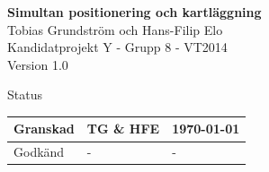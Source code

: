 \documentclass[a4paper,12pt,fleqn]{article}
\begin{document}
	\pagestyle{fancy}
	\vspace*{\fill}
		\begingroup
			\begin{center}
				\huge{\textbf{Simultan positionering och kartläggning}}
				\\
				\vspace{10pt}
				\normalsize
				Tobias Grundström och Hans-Filip Elo
				\\
				Kandidatprojekt Y - Grupp 8 - VT2014
				\\
				Version 1.0
				\end{center}
		\endgroup
	\vspace*{\fill}

	\begin{center} %
		Status
		\\
		\vspace{3pt} %
	    \begin{tabular}{| p{3cm} | p{3cm} | p{3cm} |} %
	    \hline %
	    Granskad & TG \& HFE & \today \\ \hline %
		Godkänd & - & - \\ \hline %

	    \end{tabular}
	\end{center}
	\vspace{2cm}
	\newpage
\end{document}
